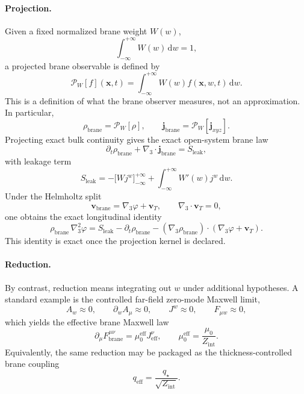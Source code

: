 \documentclass[11pt]{article}
\theoremstyle{definition}
\begin{document}
\paragraph{Projection.}
Given a fixed normalized brane weight \(W(w)\),
\[
\int_{-\infty}^{+\infty} W(w)\,\mathrm dw=1,
\]
a projected brane observable is defined by
\[
\mathcal P_W[f](\mathbf x,t)=\int_{-\infty}^{+\infty} W(w) f(\mathbf x,w,t)\,\mathrm dw.
\]
This is a definition of what the brane observer measures, not an approximation. In particular,
\[
\rho_{\mathrm{brane}}=\mathcal P_W[\rho],
\qquad
\mathbf j_{\mathrm{brane}}=\mathcal P_W[\mathbf j_{xyz}].
\]
Projecting exact bulk continuity gives the exact open-system brane law
\begin{equation}
\partial_t\rho_{\mathrm{brane}}+\nabla_3\cdot \mathbf j_{\mathrm{brane}}=S_{\mathrm{leak}},
\label{eq:projected-continuity}
\end{equation}
with leakage term
\begin{equation}
S_{\mathrm{leak}}
=
-\bigl[Wj^w\bigr]_{-\infty}^{+\infty}
+\int_{-\infty}^{+\infty} W'(w) j^w\,\mathrm dw.
\label{eq:leakage}
\end{equation}
Under the Helmholtz split
\[
\mathbf v_{\mathrm{brane}}=\nabla_3\varphi+\mathbf v_T,
\qquad
\nabla_3\cdot\mathbf v_T=0,
\]
one obtains the exact longitudinal identity
\begin{equation}
\rho_{\mathrm{brane}}\,\nabla_3^2\varphi
=
S_{\mathrm{leak}}
-\partial_t\rho_{\mathrm{brane}}
-(\nabla_3\rho_{\mathrm{brane}})\cdot(\nabla_3\varphi+\mathbf v_T).
\label{eq:longitudinal-identity}
\end{equation}
This identity is exact once the projection kernel is declared.

\paragraph{Reduction.}
By contrast, reduction means integrating out \(w\) under additional hypotheses. A standard example is the controlled far-field zero-mode Maxwell limit,
\begin{equation}
A_w\approx 0,
\qquad
\partial_w A_\mu\approx 0,
\qquad
J^w\approx 0,
\qquad
F_{\mu w}\approx 0,
\label{eq:zero-mode-assumptions}
\end{equation}
which yields the effective brane Maxwell law
\begin{equation}
\partial_\mu F^{\mu\nu}_{\mathrm{brane}}=\mu_0^{\mathrm{eff}} J^{\nu}_{\mathrm{eff}},
\qquad
\mu_0^{\mathrm{eff}}=\frac{\mu_0}{Z_{\mathrm{int}}}.
\label{eq:effective-maxwell}
\end{equation}
Equivalently, the same reduction may be packaged as the thickness-controlled brane coupling
\[
q_{\mathrm{eff}}=\frac{q_\star}{\sqrt{Z_{\mathrm{int}}}}.
\]
\end{document}
